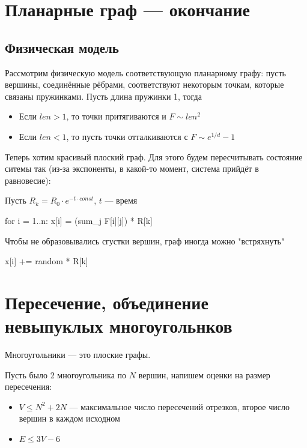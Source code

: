 
\section{Планарные граф --- окончание}

\subsection{Физическая модель}

Рассмотрим физическую модель соответствующую планарному графу:
пусть вершины, соединённые рёбрами, соответствуют некоторым точкам,
которые связаны пружинками. Пусть длина пружинки 1, тогда 

\begin{itemize}
    \item Если $len > 1$, то точки притягиваются и $F \sim len^2$
    \item Если $len < 1$, то пусть точки отталкиваются с $F \sim e^{1/d} - 1$
\end{itemize}

Теперь хотим красивый плоский граф. Для этого будем пересчитывать состояние
ситемы так (из-за экспоненты, в какой-то момент, система прийдёт в равновесие):

Пусть $R_k = R_0 \cdot e^{-t \cdot const}$, $t$ --- время

\begin{cppcode}
    for i = 1..n:
        x[i] = (sum\_j F[i][j]) * R[k]
\end{cppcode}

Чтобы не образовывались сгустки вершин, граф иногда можно "встряхнуть"
\begin{cppcode}
    x[i] += random * R[k]
\end{cppcode}

\section{Пересечение, объединение невыпуклых многоугольнков}

Многоугольники --- это плоские графы.

Пусть было 2 многоугольника по $N$ вершин, напишем оценки на размер пересечения:

\begin{itemize}
    \item $V \leq N^2 + 2N$ --- максимальное число пересечений отрезков,
        второе число вершин в каждом исходном
    \item $E \leq 3V - 6$
\end{itemize}

